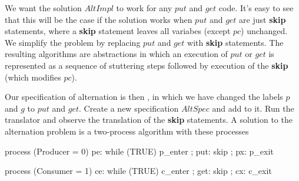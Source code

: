 \documentclass[fleqn,leqno]{article}
\begin{document}
We want the solution $AltImpl$ to work for any $put$ and $get$ code.
It's easy to see that this will be the case if the solution works when
$put$ and $get$ are just \textbf{skip} statements, where
a \textbf{skip} statement leaves all variabes (except $pc$) unchanged.
We simplify the problem by replacing $put$ and $get$ with
\textbf{skip} statements.  The resulting algorithms are abstractions
in which an execution of $put$ or $get$ is represented as a sequence
of stuttering steps followed by execution of the \textbf{skip} (which
modifies $pc$).  


Our specification of alternation is then , in which we have changed the labels $p$ and $g$
to $put$ and $get$.  Create a new specification $AltSpec$ and
add 
to it.  Run the translator and observe the translation of the
\textbf{skip} statements.  A solution to the alternation problem is
a two-process algorithm with these processes
\begin{display}
\begin{twocols}[.4]
\begin{nopcal}
process (Producer = 0) 
  { pe: while (TRUE) 
          {      p_enter ;
            put: skip ;
            px:  p_exit     }
  }
\end{nopcal}      
\begin{tlatex}
%
%
%
%
\end{tlatex}
\midcol
\begin{nopcal}
process (Consumer = 1)
  { ce: while (TRUE)
          {      c_enter ;
            get: skip ; 
            cx:  c_exit        }
  }
\end{nopcal}
\begin{tlatex}
%
%
%
%
\end{tlatex}
\end{twocols}
\end{display}
\end{document}
